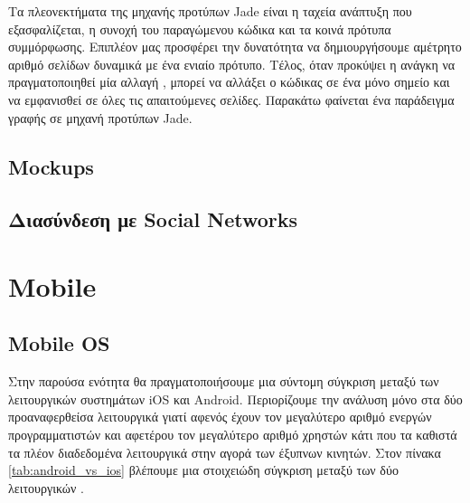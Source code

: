 Τα πλεονεκτήματα της μηχανής προτύπων Jade είναι η ταχεία ανάπτυξη που εξασφαλίζεται, η συνοχή του παραγώμενου κώδικα και τα κοινά πρότυπα συμμόρφωσης. Επιπλέον μας προσφέρει την δυνατότητα να δημιουργήσουμε αμέτρητο αριθμό σελίδων δυναμικά με ένα ενιαίο πρότυπο. Τέλος, όταν προκύψει η ανάγκη να πραγματοποιηθεί μία αλλαγή , μπορεί  να αλλάξει ο κώδικας σε ένα μόνο σημείο και να εμφανισθεί σε όλες τις απαιτούμενες σελίδες. Παρακάτω	φαίνεται ένα παράδειγμα γραφής σε μηχανή προτύπων Jade.
	
	
	\subsection{Mockups}
	\subsection{Διασύνδεση με Social Networks}

\section{Mobile}
	\subsection{Mobile OS}
		Στην παρούσα ενότητα θα πραγματοποιήσουμε μια σύντομη σύγκριση μεταξύ των λειτουργικών συστημάτων iOS και Android. Περιορίζουμε την ανάλυση μόνο στα δύο προαναφερθείσα λειτουργικά γιατί αφενός έχουν τον μεγαλύτερο αριθμό ενεργών προγραμματιστών και αφετέρου τον μεγαλύτερο αριθμό χρηστών κάτι που τα καθιστά τα πλέον διαδεδομένα λειτουργικά στην αγορά των έξυπνων κινητών. Στον πίνακα \ref{tab:android_vs_ios} βλέπουμε μια στοιχειώδη σύγκριση μεταξύ των δύο λειτουργικών \cite{smartphoneMarketShare}\cite{androidPublish}\cite{applePublish}\cite{androidSource}.
		
